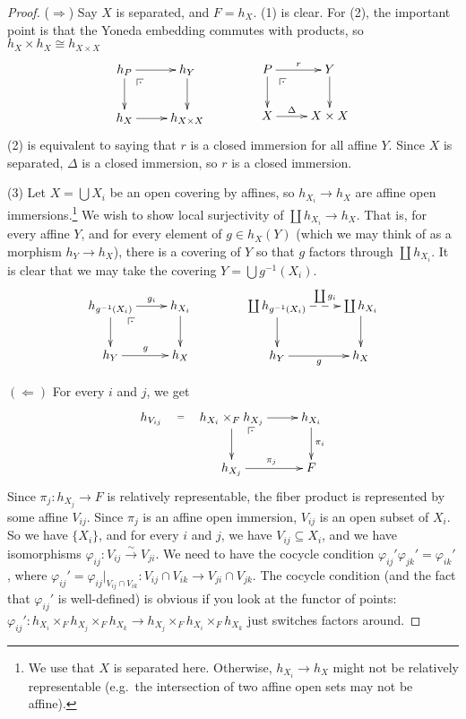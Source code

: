 \begin{proof}
  ($\Longrightarrow$) Say $X$ is separated, and $F=h_X$. (1) is clear. For (2), the
  important point is that the Yoneda embedding commutes with products, so $h_X\times
  h_X\cong h_{X\times X}$
  \[\xymatrix{
   h_P \ar[r] \ar[d] \ar@{}[dr]|(.25){\pb} & h_Y \ar[d]\\
   h_X \ar[r] & h_{X\times X}
  }\qquad\qquad
  \xymatrix{
   P\ar[r]^r \ar[d] \ar@{}[dr]|(.25){\pb} & Y\ar[d]\\
   X\ar[r]^<>(.5)\Delta & X\times X
  }\]
  (2) is equivalent to saying that $r$ is a closed immersion for all affine $Y$. Since
  $X$ is separated, $\Delta$ is a closed immersion, so $r$ is a closed immersion.

  (3) Let $X = \bigcup X_i$ be an open covering by affines, so $h_{X_i}\to h_X$ are
  affine open immersions.\footnote{We use that $X$ is separated here. Otherwise,
  $h_{X_i}\to h_X$ might not be relatively representable (e.g.~the intersection of two
  affine open sets may not be affine).} We wish to show local surjectivity of $\coprod
  h_{X_i}\to h_X$. That is, for every affine $Y$, and for every element of $g\in h_X(Y)$
  (which we may think of as a morphism $h_Y\to h_X$), there is a covering of $Y$ so that
  $g$ factors through $\coprod h_{X_i}$. It is clear that we may take the covering
  $Y=\bigcup g^{-1}(X_i)$.
  \[\xymatrix{
   h_{g^{-1}(X_i)} \ar@{}[dr]|(.3)\pb \ar[r]^<>(.5){g_i} \ar[d] & h_{X_i}\ar[d]\\
   h_Y \ar[r]^g & h_X
  }\qquad\qquad
  \xymatrix{
   \coprod h_{g^{-1}(X_i)} \ar[d] \ar@{-->}[r]^<>(.5){\coprod g_i} & \coprod h_{X_i}\ar[d]\\
   h_Y \ar[r]_g & h_X }
  \]

  $(\Longleftarrow)$ For every $i$ and $j$, we get
  \[\xymatrix{
   h_{V_{ij}}\ar@{}[r]|<>(.5){=}
   & h_{X_i}\times_F h_{X_j} \ar[d] \ar[r] \ar@{}[dr]|(.25)\pb
   & h_{X_i} \ar[d]^{\pi_i} \\
   & h_{X_j} \ar[r]^{\pi_j} & F
  }\]
   Since $\pi_j:h_{X_j}\to F$ is relatively representable, the fiber product is
  represented by some affine $V_{ij}$. Since $\pi_j$ is an affine open immersion,
  $V_{ij}$ is an open subset of $X_i$. So we have $\{X_i\}$, and for every $i$ and $j$,
  we have $V_{ij}\subseteq X_i$, and we have isomorphisms
  $\varphi_{ij}:V_{ij}\xrightarrow\sim V_{ji}$. We need to have the cocycle condition
  $\varphi_{ij}'\varphi_{jk}'=\varphi_{ik}'$, where
  $\varphi_{ij}'=\varphi_{ij}|_{V_{ij}\cap V_{ik}}:V_{ij}\cap V_{ik} \to V_{ji}\cap
  V_{jk}$. The cocycle condition (and the fact that $\varphi_{ij}'$ is well-defined) is
  obvious if you look at the functor of points: $\varphi_{ij}':h_{X_i}\times_F
  h_{X_j}\times_F h_{X_k}\to h_{X_j}\times_F h_{X_i}\times_F h_{X_k}$ just switches
  factors around.


\end{proof}
